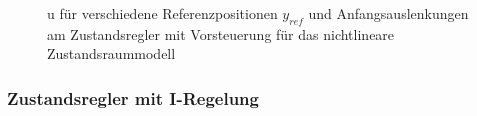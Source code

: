 \begin{figure}[H]
    \centering
    \caption[u für Regler mit Vorsteuerung (nichtlinear)]{u für verschiedene Referenzpositionen $y_{ref}$ und Anfangsauslenkungen am Zustandsregler mit Vorsteuerung für das nichtlineare Zustandsraummodell}
    \label{fig:Bild35}
\end{figure}

\subsubsection{Zustandsregler mit I-Regelung}

